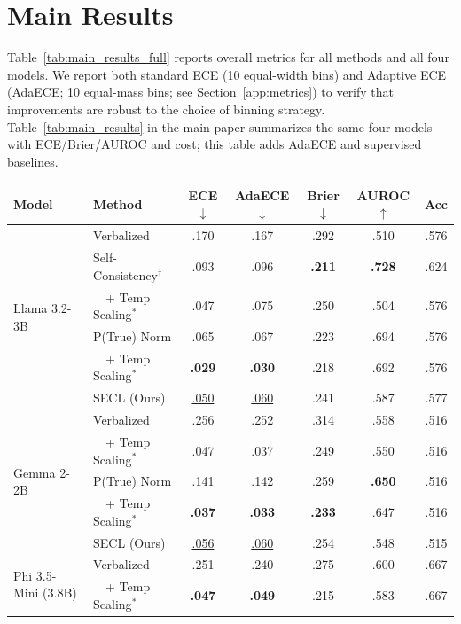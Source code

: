 \section{Main Results} \label{app:main_results}

Table~\ref{tab:main_results_full} reports overall metrics for all methods and all four models.
We report both standard ECE (10 equal-width bins) and Adaptive ECE (AdaECE; 10 equal-mass bins; see Section~\ref{app:metrics}) to verify that improvements are robust to the choice of binning strategy.
Table~\ref{tab:main_results} in the main paper summarizes the same four models with ECE/Brier/AUROC and cost; this table adds AdaECE and supervised baselines.

\begin{table}[htbp]
\centering
\footnotesize
\begin{tabular}{llccccc}
\toprule
\textbf{Model} & \textbf{Method}
  & \textbf{ECE}$\downarrow$ & \textbf{AdaECE}$\downarrow$ & \textbf{Brier}$\downarrow$
  & \textbf{AUROC}$\uparrow$ & \textbf{Acc} \\
\midrule
\multirow{6}{*}{Llama 3.2-3B}
  & Verbalized     & .170 & .167 & .292 & .510 & .576 \\
  & Self-Consistency$^\dagger$  & .093 & .096 & \textbf{.211} & \textbf{.728} & .624 \\
  & ~~+ Temp Scaling$^*$ & .047 & .075 & .250 & .504 & .576 \\
  & P(True) Norm        & .065 & .067 & .223 & .694 & .576 \\
  & ~~+ Temp Scaling$^*$ & \textbf{.029} & \textbf{.030} & .218 & .692 & .576 \\
  & SECL (Ours)         & \underline{.050} & \underline{.060} & .241 & .587 & .577 \\
\midrule
\multirow{5}{*}{Gemma 2-2B}
  & Verbalized     & .256 & .252 & .314 & .558 & .516 \\
  & ~~+ Temp Scaling$^*$ & .047 & .037 & .249 & .550 & .516 \\
  & P(True) Norm        & .141 & .142 & .259 & \textbf{.650} & .516 \\
  & ~~+ Temp Scaling$^*$ & \textbf{.037} & \textbf{.033} & \textbf{.233} & .647 & .516 \\
  & SECL (Ours)         & \underline{.056} & \underline{.060} & .254 & .548 & .515 \\
\midrule
\multirow{5}{*}{Phi 3.5-Mini (3.8B)}
  & Verbalized     & .251 & .240 & .275 & .600 & .667 \\
  & ~~+ Temp Scaling$^*$ & \textbf{.047} & \textbf{.049} & .215 & .583 & .667 \\

\end{tabular}
\end{table}

